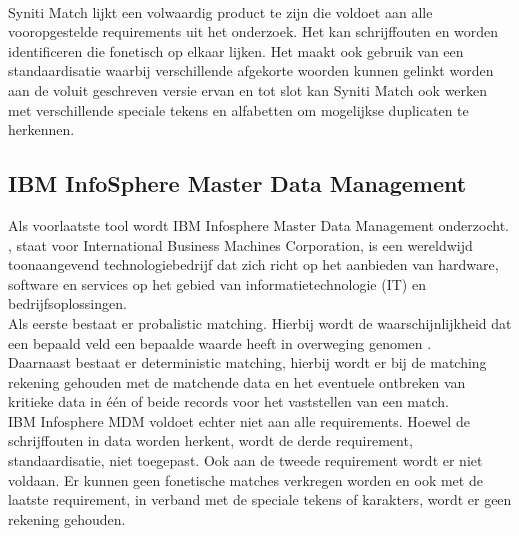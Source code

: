 \\Syniti Match lijkt een volwaardig product te zijn die voldoet aan alle vooropgestelde requirements uit het onderzoek. Het kan schrijffouten en worden identificeren die fonetisch op elkaar lijken. Het maakt ook gebruik van een standaardisatie waarbij verschillende afgekorte woorden kunnen gelinkt worden aan de voluit geschreven versie ervan en tot slot kan Syniti Match ook werken met verschillende speciale tekens en alfabetten om mogelijkse duplicaten te herkennen.

\subsection{IBM InfoSphere Master Data Management}
Als voorlaatste tool wordt IBM Infosphere Master Data Management onderzocht. 
\textcite{IBMAbout}, staat voor International Business Machines Corporation, is een wereldwijd toonaangevend technologiebedrijf dat zich richt op het aanbieden van hardware, software en services op het gebied van informatietechnologie (IT) en bedrijfsoplossingen.
\\Als eerste bestaat er probalistic matching.  Hierbij wordt de waarschijnlijkheid dat een bepaald veld een bepaalde waarde heeft in overweging genomen \autocite{IBMMatching}.
\\Daarnaast bestaat er deterministic matching, hierbij wordt er bij de matching rekening gehouden met de matchende data en het eventuele ontbreken van kritieke data in één of beide records voor het vaststellen van een match. 
\\IBM Infosphere MDM voldoet echter niet aan alle requirements. Hoewel de schrijffouten in data worden herkent, wordt de derde requirement, standaardisatie, niet toegepast. Ook aan de tweede requirement wordt er niet voldaan. Er kunnen geen fonetische matches verkregen worden en ook met de laatste requirement, in verband met de speciale tekens of karakters, wordt er geen rekening gehouden.

